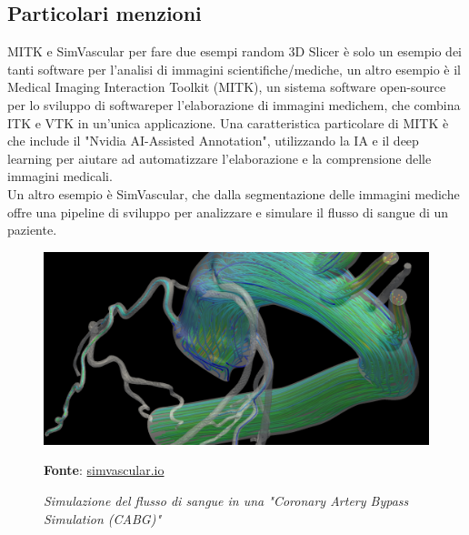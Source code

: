 \subsection{Particolari menzioni}
MITK e SimVascular per fare due esempi random
3D Slicer è solo un esempio dei tanti software per l'analisi di immagini scientifiche/mediche, un altro esempio è il Medical Imaging Interaction Toolkit (MITK), un sistema software open-source per lo sviluppo di softwareper l'elaborazione di immagini medichem, che combina ITK e VTK in un'unica applicazione. Una caratteristica particolare di MITK è che include il "Nvidia AI-Assisted Annotation", utilizzando la IA e il deep learning per aiutare ad automatizzare l'elaborazione e la comprensione delle immagini medicali.
\\
Un altro esempio è SimVascular, che dalla segmentazione delle immagini mediche offre una pipeline di sviluppo per analizzare e simulare il flusso di sangue di un paziente.
\begin{figure}[h]
    \centering
    \includegraphics[scale=0.2]{immagini/volumerendering/simvascular.png}
    \caption{\textit{Simulazione del flusso di sangue in una "Coronary Artery Bypass Simulation (CABG)"}}
    \textbf{Fonte}: \href{http://simvascular.github.io/}{simvascular.io}
    \label{fig: SimVascular}
\end{figure}


